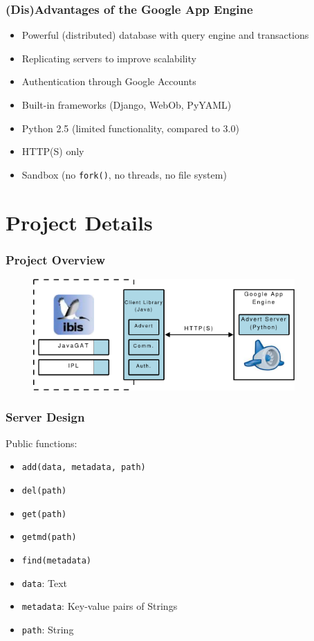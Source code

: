 \documentclass{beamer}
\begin{document}
\frame
{
	\frametitle{(Dis)Advantages of the Google App Engine}
	\begin{itemize}
		\item <1->Powerful (distributed) database with query engine and
			transactions
		\item <1->Replicating servers to improve scalability 
		\item <1->Authentication through Google Accounts
		\item <1->Built-in frameworks (Django, WebOb, PyYAML)
	\end{itemize}

	\begin{itemize}
		\item <2->Python 2.5 (limited functionality, compared to 3.0)
		\item <2->HTTP(S) only
		\item <2->Sandbox (no \texttt{fork()}, no threads, no file system)
	\end{itemize}
}

\section{Project Details}
\frame
{
	\frametitle{Project Overview}
	\begin{figure}
	\begin{center}
	\includegraphics[width=10cm]{proj_design.pdf} 
	\end{center}
	\end{figure}
}

\frame
{
	\frametitle{Server Design}
	Public functions:
	\begin{itemize}
		\item \texttt{add(data, metadata, path)}
		\item \texttt{del(path)}
		\item \texttt{get(path)}
		\item \texttt{getmd(path)}
		\item \texttt{find(metadata)}
	\end{itemize}
	\begin{itemize}
		\item \texttt{data}: Text
		\item \texttt{metadata}: Key-value pairs of Strings
		\item \texttt{path}: String
	\end{itemize}
}
\end{document}
